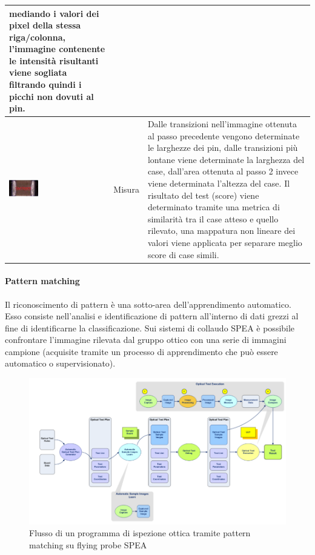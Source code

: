 \begin{tabularx}{\textwidth}{p{.3\linewidth} | p{.16\linewidth} |p{.45\linewidth}}
mediando i valori dei pixel della stessa riga/colonna, l'immagine contenente le intensità risultanti viene sogliata filtrando quindi i picchi non dovuti al pin.\\
\hline
\vspace{.5mm}
\includegraphics[width=0.3\textwidth]{img/smtcapacitor-measure.png}& Misura & Dalle transizioni nell'immagine ottenuta al passo precedente
vengono determinate le larghezze dei pin, dalle transizioni
più lontane viene determinate la larghezza del case,
dall'area ottenuta al passo 2 invece viene determinata
l'altezza del case.
Il risultato del test (score) viene determinato tramite una
metrica di similarità tra il case atteso e quello rilevato, una
mappatura non lineare dei valori viene applicata per
separare meglio score di case simili.
\end{tabularx}

\paragraph{Pattern matching}
Il riconoscimento di pattern è una sotto-area dell'apprendimento automatico. Esso consiste nell'analisi e
identificazione di pattern all'interno di dati grezzi al fine di identificarne la classificazione.
Sui sistemi di collaudo SPEA è possibile confrontare l'immagine rilevata dal gruppo ottico con una serie di immagini
campione (acquisite tramite un processo di apprendimento che può essere automatico o supervisionato).


\begin{figure}[!ht]
\centering
\includegraphics[width=\textwidth]{img/patternmatching.png}
\caption{Flusso di un programma di ispezione ottica tramite pattern matching su flying probe SPEA}
\label{fig:pattern matching}
\end{figure}

